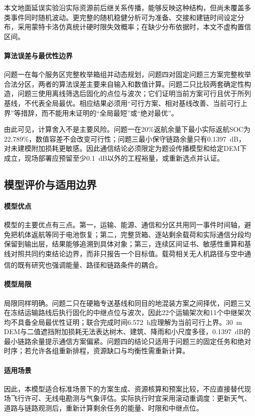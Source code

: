 本文地面延误实验沿实际资源前后继关系传播，能够反映这种结构，但尚未覆盖多类事件同时随机波动。更完整的随机稳健分析可为准备、交接和建链时间设定分布，采用蒙特卡洛仿真统计硬时限失效概率；在缺少分布依据时，本文不虚构置信区间。

\paragraph{算法误差与最优性边界}
问题一在每个服务区完整枚举箱组并动态规划，问题四对固定问题三方案完整枚举合法分区，两者的算法误差主要来自输入和数值计算。问题二只比较两套确定性构造，问题三使用离线筛选后固化的点位与波次；它们证明当前方案可行且优于所列基线，不代表全局最优。相应结果必须用“可行方案、相对基线改善、当前可行上界”等措辞，而不能用未证明的“全局最短”或“绝对最优”。

由此可见，计算舍入不是主要风险。问题一在20\%返航余量下最小实际返航SOC为22.789\%，数值容差不会改变可行性；问题三最小保守链路余量只有0.1397~dB，对未建模附加损耗更敏感。因此通信结论必须限定为题设传播模型和给定DEM下成立，现场部署应预留至少0.1~dB以外的工程裕量，或重新选点并认证。

\subsection{模型评价与适用边界}
\paragraph{模型优点}
模型的主要优点有三点。第一，运输、能源、通信和分区共用同一事件时间轴，避免把机体返航等同于电池恢复；第二，完整货箱、逐站剩余载荷和实际通信分段均保留到输出层，结果能够追溯到具体对象；第三，连续区间证书、敏感性重算和基线对照共同约束结论边界，而非只报告一个目标值。载荷相关无人机路径与空中通信的既有研究也强调能量、路径和链路条件的耦合\textsuperscript{\cite{Dorling2017,Zeng2016}}。

\paragraph{模型局限}
局限同样明确。问题二只在硬箱专送基线和同目的地混装方案之间择优，问题三又在冻结运输路线后执行固化的中继点位与波次，因此22个运输架次和11个中继架次均不具备全局最优性证明；联合完成时间6.572~h应理解为当前可行上界。30~m DEM与二值遮挡附加损耗无法表达树木、建筑、降雨和小尺度多径，0.1397~dB的最小链路余量提示通信方案偏紧。问题四的结论只适用于问题三的固定任务和绝对时序；若允许各组重新排程，资源缺口与均衡性需重新计算。

\paragraph{适用场景}
因此，本模型适合标准场景下的方案生成、资源核算和预案比较，不应直接替代现场飞行许可、无线电勘测与气象评估。实际执行时宜采用滚动重调度：更新天气、道路与链路观测后，重新计算剩余任务的能量、时限和中继点位。

